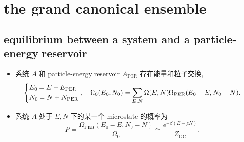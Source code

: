 \chapter{the grand canonical ensemble}
\section{equilibrium between a system and a particle-energy reservoir} \label{4.1}
\begin{itemize}
	\item 系统 $A$ 和 particle-energy reservoir $A_\text{PER}$ 存在能量和粒子交换,
	\begin{equation}
		\begin{dcases}
			E_0 = E + E_\text{PER} \\
			N_0 = N + N_\text{PER}
		\end{dcases}, \quad \Omega_0(E_0, N_0) = \sum_{E, N} \Omega(E, N) \Omega_\text{PER}(E_0 - E, N_0 - N).
	\end{equation}
	
	\item 系统 $A$ 处于 $E, N$ 下的某一个 microstate 的概率为
	\begin{equation}
		P = \frac{\Omega_\text{PER}(E_0 - E, N_0 - N)}{\Omega_0} \simeq \frac{e^{- \beta (E - \mu N)}}{Z_\text{GC}}.
	\end{equation}
\end{itemize}

